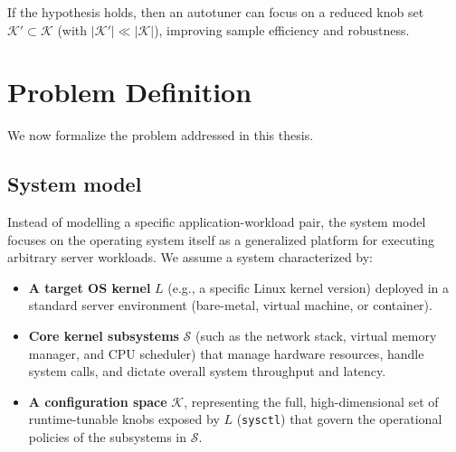 If the hypothesis holds, then an autotuner can focus on a reduced knob set $\mathcal{K}' \subset \mathcal{K}$ (with $|\mathcal{K}'| \ll |\mathcal{K}|$), improving sample efficiency and robustness.

\section{Problem Definition}\label{sec:problem-definition}

We now formalize the problem addressed in this thesis.

\subsection{System model}\label{sec:problem-model}

Instead of modelling a specific application-workload pair, the system model focuses on the operating system itself as a generalized platform for executing arbitrary server workloads. We assume a system characterized by:
\begin{itemize}
    \item \textbf{A target OS kernel} $L$ (e.g., a specific Linux kernel version) deployed in a standard server environment (bare-metal, virtual machine, or container).
    \item \textbf{Core kernel subsystems} $\mathcal{S}$ (such as the network stack, virtual memory manager, and CPU scheduler) that manage hardware resources, handle system calls, and dictate overall system throughput and latency.
    \item \textbf{A configuration space} $\mathcal{K}$, representing the full, high-dimensional set of runtime-tunable knobs exposed by $L$ (\texttt{sysctl}) that govern the operational policies of the subsystems in $\mathcal{S}$.
\end{itemize}

